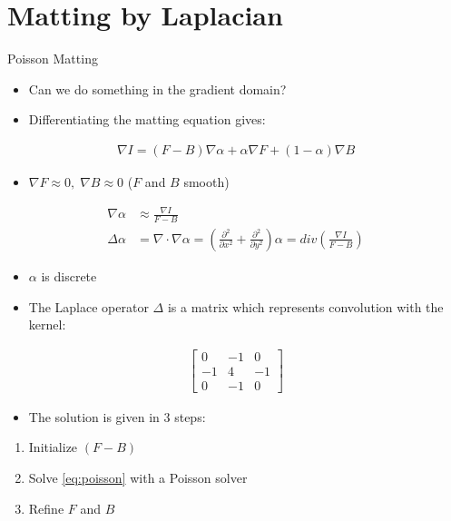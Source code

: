 \documentclass{beamer}
\begin{document}
\section{Matting by Laplacian}%

\begin{frame}[allowframebreaks]{Poisson Matting \cite{sun2004poisson}}
 \begin{itemize}
  \item Can we do something in the gradient domain?
  \item Differentiating the  matting equation gives:
 \end{itemize}
 \begin{align}
  \nabla I = (F-B)\nabla \alpha + \alpha \nabla F + (1-\alpha) \nabla B
 \end{align}
 \begin{itemize}
  \item $\nabla F \approx 0,\; \nabla B \approx 0$ ($F$ and $B$ smooth)
 \end{itemize}
 \begin{align}
  \nabla \alpha &\approx \frac{\nabla I}{F-B}\\
  \Delta \alpha &= \nabla \cdot \nabla \alpha = \left(\frac{\partial^2}{\partial x^2} + \frac{\partial^2}{\partial y^2}\right) \alpha = div \left( \frac{\nabla I}{F-B} \right) \label{eq:poisson}
 \end{align}
 \begin{itemize}
  \item $\alpha$ is discrete
  \item The Laplace operator $\Delta$ is a matrix which represents convolution
        with the kernel:
 \end{itemize}
 \begin{align}
  \begin{bmatrix}
   0  & -1 & 0 \\
   -1 &  4 & -1 \\
   0  & -1 & 0
  \end{bmatrix}
 \end{align}
 \begin{itemize}
  \item The solution is given in 3 steps:
 \end{itemize}
 \begin{enumerate}
  \item Initialize $(F-B)$
  \item Solve \eqref{eq:poisson} with a Poisson solver
  \item Refine $F$ and $B$

\end{enumerate}
\end{frame}
\end{document}
